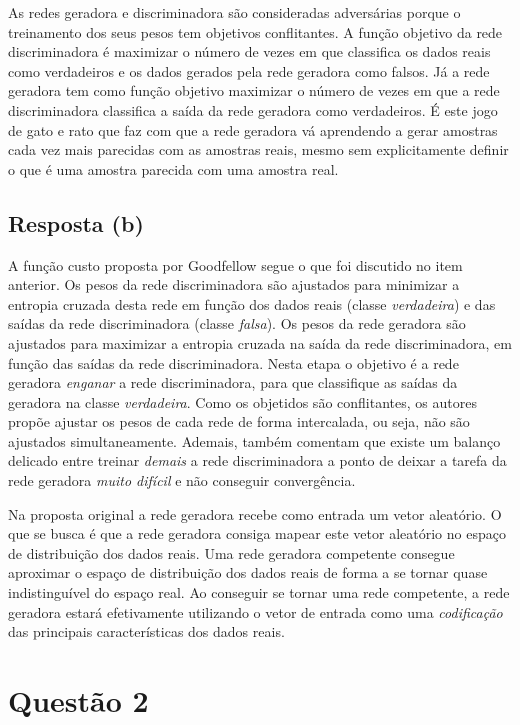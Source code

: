\documentclass[final,3p]{elsarticle}
\numberwithin{equation}{section}
\begin{document}
        As redes geradora e discriminadora são consideradas adversárias porque o treinamento dos seus pesos tem objetivos conflitantes. A função objetivo da rede discriminadora é maximizar o número de vezes em que classifica os dados reais como verdadeiros e os dados gerados pela rede geradora como falsos. Já a rede geradora tem como função objetivo maximizar o número de vezes em que a rede discriminadora classifica a saída da rede geradora como verdadeiros. É este jogo de gato e rato que faz com que a rede geradora vá aprendendo a gerar amostras cada vez mais parecidas com as amostras reais, mesmo sem explicitamente definir o que é uma amostra parecida com uma amostra real.

    \subsection{Resposta \textbf{(b)}}

        A função custo proposta por Goodfellow segue o que foi discutido no item anterior. Os pesos da rede discriminadora são ajustados para minimizar a entropia cruzada desta rede em função dos dados reais (classe \emph{verdadeira}) e das saídas da rede discriminadora (classe \emph{falsa}). Os pesos da rede geradora são ajustados para maximizar a entropia cruzada na saída da rede discriminadora, em função das saídas da rede discriminadora. Nesta etapa o objetivo é a rede geradora \emph{enganar} a rede discriminadora, para que classifique as saídas da geradora na classe \emph{verdadeira}. Como os objetidos são conflitantes, os autores propõe ajustar os pesos de cada rede de forma intercalada, ou seja, não são ajustados simultaneamente. Ademais, também comentam que existe um balanço delicado entre treinar \emph{demais} a rede discriminadora a ponto de deixar a tarefa da rede geradora \emph{muito difícil} e não conseguir convergência.

        Na proposta original a rede geradora recebe como entrada um vetor aleatório. O que se busca é que a rede geradora consiga mapear este vetor aleatório no espaço de distribuição dos dados reais. Uma rede geradora competente consegue aproximar o espaço de distribuição dos dados reais de forma a se tornar quase indistinguível do espaço real. Ao conseguir se tornar uma rede competente, a rede geradora estará efetivamente utilizando o vetor de entrada como uma \emph{codificação} das principais características dos dados reais.

\section{Questão 2}
\end{document}
